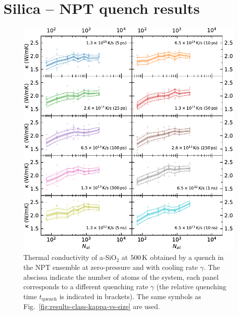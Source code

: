\chapter{Silica -- NPT quench results}  \label{ch:appendix-npt-results}

\vspace{-1cm}
\begin{figure}[!htb]
    \centering
    \includegraphics[width=\textwidth]{chapters/appendix/figures/Silica_NPT_kappa_NATconv.pdf}
    \caption{Thermal conductivity of a-SiO$_2$ at $500\,\mathrm{K}$ obtained by a quench in the NPT ensemble at zero-pressure and with cooling rate $\gamma$. 
    The abscissa indicate the number of atoms of the system, each panel corresponds to a different quenching rate $\gamma$ (the relative quenching time $t_\mathrm{quench}$ is indicated in brackets). 
    The same symbols as Fig.~\ref{fig:results-class-kappa-vs-size} are used.
    }
    \label{fig:appendix-silica-class-npt-kappa-vs-size}
\end{figure}

